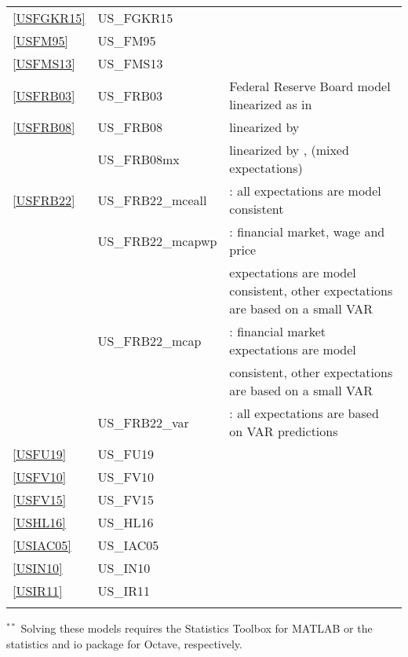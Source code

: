 \documentclass[11pt,a4paper]{article}
\begin{document}
\begin{table}[H]
\begin{tabularx}{\textwidth}{lll}
			\ref{USFGKR15} & US\_FGKR15 & \cite{FernandezVillaverdeetal2015} \\
			\ref{USFM95} & US\_FM95 & \cite{FuhrerMoore1995}  \\
			\ref{USFMS13} & US\_FMS13 & \cite{Feveetal2013} \\
			\ref{USFRB03} & US\_FRB03 & Federal Reserve Board model linearized as in \cite{LevinWielandWilliams2003} \\
			\ref{USFRB08} & US\_FRB08 & linearized by \cite{BraytonLaubach2008} \\
			& US\_FRB08mx & linearized by \cite{BraytonLaubach2008}, (mixed expectations) \\
			\ref{USFRB22}& US\_FRB22\_mceall & \cite{brayton2022linver}: all expectations are model consistent\\
			& US\_FRB22\_mcapwp & \cite{brayton2022linver}: financial market, wage and price \\&&expectations are model consistent, other expectations are based on a small VAR\\
			& US\_FRB22\_mcap & \cite{brayton2022linver}: financial market expectations are model\\&& consistent, other expectations are based on a small VAR\\
			& US\_FRB22\_var & \cite{brayton2022linver}: all expectations are based on VAR predictions\\
			\ref{USFU19} & US\_FU19 & \cite{fratto2019uhlig} \\
			\ref{USFV10} & US\_FV10 & \cite{fernandez2010econometrics}\\
			\ref{USFV15} & US\_FV15 & \cite{fernandez2015estimating}\\
			\ref{USHL16} & US\_HL16 & \cite{hollander2016liu}\\
			\ref{USIAC05} & US\_IAC05 & \cite{Iacoviello2005} \\
			\ref{USIN10} & US\_IN10 & \cite{IacovielloNeri2010} \\
			\ref{USIR11} & US\_IR11 & \cite{Ireland2011} \\
			
			
			&& \\
			\hline \hline
		\end{tabularx} 
		\footnotesize \noindent $ ^{\ast \ast}$ Solving these models requires the Statistics Toolbox for MATLAB or the statistics and io package for Octave, respectively. %
		
	\end{table}
	
\end{document}
